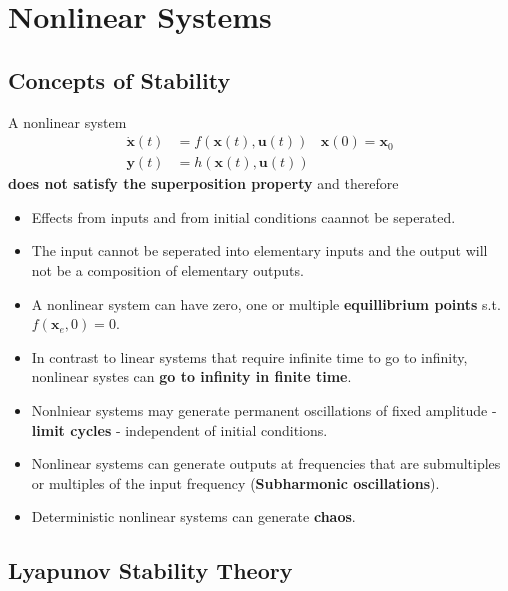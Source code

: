 \section{Nonlinear Systems}

\subsection{Concepts of Stability}
A nonlinear system
\noindent\begin{align*}
    \dot{\mathbf{x}}(t) & = f(\mathbf{x}(t), \mathbf{u}(t)) & \mathbf{x}(0)=\mathbf{x}_0 \\
    \mathbf{y}(t)       & = h(\mathbf{x}(t), \mathbf{u}(t))
\end{align*}
\textbf{does not satisfy the superposition property} and therefore
\begin{itemize}
    \item Effects from inputs and from initial conditions caannot be seperated.
    \item The input cannot be seperated into elementary inputs and the output will not be a composition of elementary outputs.
\end{itemize}

\newpar{}
\begin{itemize}
    \item A nonlinear system can have zero, one or multiple \textbf{equillibrium points} s.t.\ $f(\mathbf{x}_e, 0)=0$.
    \item In contrast to linear systems that require infinite time to go to infinity, nonlinear systes can \textbf{go to infinity in finite time}.
    \item Nonlniear systems may generate permanent oscillations of fixed amplitude - \textbf{limit cycles} - independent of initial conditions.
    \item Nonlinear systems can generate outputs at frequencies that are submultiples or multiples of the input frequency (\textbf{Subharmonic oscillations}).
    \item Deterministic nonlinear systems can generate \textbf{chaos}.
\end{itemize}

\subsection{Lyapunov Stability Theory}
